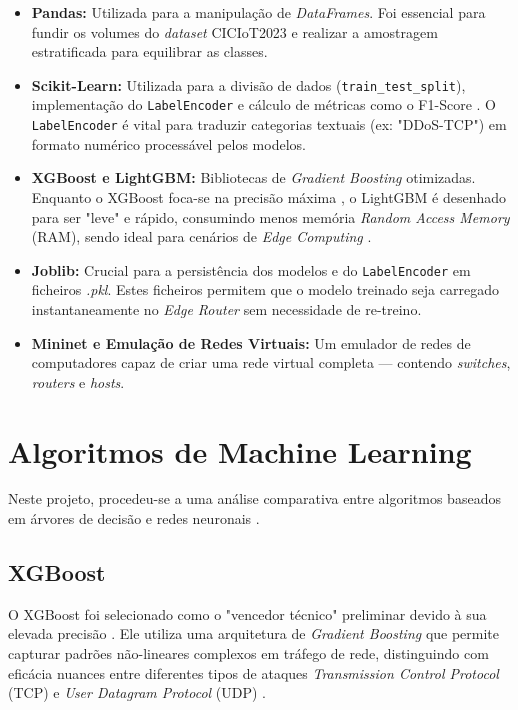 \begin{itemize}
    \item \textbf{Pandas:} Utilizada para a manipulação de \textit{DataFrames}. Foi essencial para fundir os volumes do \textit{dataset} CICIoT2023 e realizar a amostragem estratificada para equilibrar as classes.
    
    \item \textbf{Scikit-Learn:} Utilizada para a divisão de dados (\texttt{train\_test\_split}), implementação do \texttt{LabelEncoder} e cálculo de métricas como o F1-Score \cite{pedregosa2011scikit}. O \texttt{LabelEncoder} é vital para traduzir categorias textuais (ex: "DDoS-TCP") em formato numérico processável pelos modelos.
    
    \item \textbf{XGBoost e LightGBM:} Bibliotecas de \textit{Gradient Boosting} otimizadas. Enquanto o XGBoost foca-se na precisão máxima \cite{chen2016xgboost}, o LightGBM é desenhado para ser "leve" e rápido, consumindo menos memória \textit{Random Access Memory} (RAM), sendo ideal para cenários de \textit{Edge Computing} \cite{ke2017lightgbm}.
    
    \item \textbf{Joblib:} Crucial para a persistência dos modelos e do \texttt{LabelEncoder} em ficheiros \textit{.pkl}. Estes ficheiros permitem que o modelo treinado seja carregado instantaneamente no \textit{Edge Router} sem necessidade de re-treino.
    
    \item \textbf{Mininet e Emulação de Redes Virtuais:} Um emulador de redes de computadores capaz de criar uma rede virtual completa --- contendo \textit{switches}, \textit{routers} e \textit{hosts}.
\end{itemize}


\section{Algoritmos de Machine Learning}
\label{chap3:sec:algoritmos}
Neste projeto, procedeu-se a uma análise comparativa entre algoritmos baseados em árvores de decisão e redes neuronais \cite{AlGaradi2020, Roopak2019}.

\subsection{XGBoost}
O \ac{XGBoost} foi selecionado como o "vencedor técnico" preliminar devido à sua elevada precisão \cite{chen2016xgboost, Ahmad2018}. Ele utiliza uma arquitetura de \textit{Gradient Boosting} que permite capturar padrões não-lineares complexos em tráfego de rede, distinguindo com eficácia nuances entre diferentes tipos de ataques \textit{Transmission Control Protocol} (\ac{TCP}) e \textit{User Datagram Protocol} (\ac{UDP}) \cite{Berman2019}.

